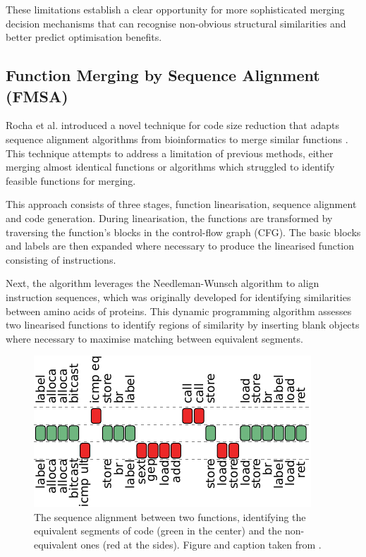 These limitations establish a clear opportunity for more sophisticated merging decision mechanisms that can recognise non-obvious structural similarities and better predict optimisation benefits.

\subsection{Function Merging by Sequence Alignment (FMSA)}
Rocha et al. introduced a novel technique for code size reduction that adapts sequence alignment algorithms from bioinformatics to merge similar functions \cite{FunctionMergingSequenceAlignment}. This technique attempts to address a limitation of previous methods, either merging almost identical functions or algorithms which struggled to identify feasible functions for merging.

This approach consists of three stages, function linearisation, sequence alignment and code generation. During linearisation, the functions are transformed by traversing the function's blocks in the control-flow graph (CFG). The basic blocks and labels are then expanded where necessary to produce the linearised function consisting of instructions. 

Next, the algorithm leverages the Needleman-Wunsch algorithm to align instruction sequences, which was originally developed for identifying similarities between amino acids of proteins. This dynamic programming algorithm assesses two linearised functions to identify regions of similarity by inserting blank objects where necessary to maximise matching between equivalent segments. 

\begin{figure}[tbh!]
\centering
\includegraphics[scale=1]{Figures/FMSA_FunctionSA.pdf}
\caption{The sequence alignment between two functions, identifying the equivalent segments of code (green in the center) and the non-equivalent ones (red at the sides). Figure and caption taken from \cite{FunctionMergingSequenceAlignment}.}\label{fig:SequenceAlignment2Funcs}
\end{figure}

